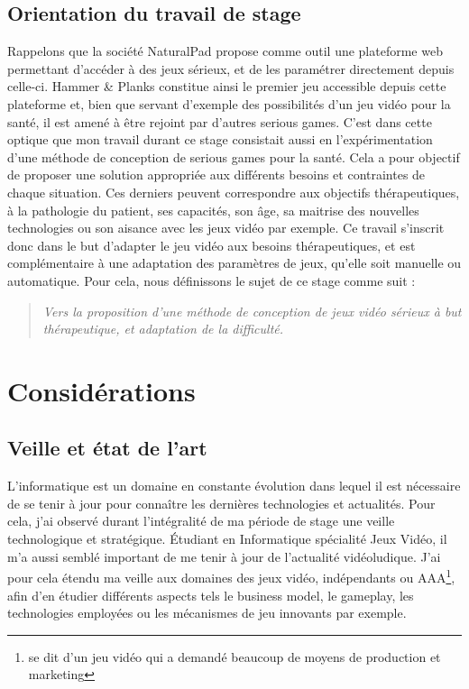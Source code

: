 \documentclass[french, 12pt]{article} %
\begin{document}
	\subsection{Orientation du travail de stage}
Rappelons que la société NaturalPad propose comme outil une plateforme web permettant d'accéder à des jeux sérieux, et de les paramétrer directement depuis celle-ci. Hammer \& Planks constitue ainsi le premier jeu accessible depuis cette plateforme et, bien que servant d'exemple des possibilités d'un jeu vidéo pour la santé, il est amené à être rejoint par d'autres serious games. C'est dans cette optique que mon travail durant ce stage consistait aussi en l'expérimentation d'une méthode de conception de serious games pour la santé. Cela a pour objectif de proposer une solution appropriée aux différents besoins et contraintes de chaque situation. Ces derniers peuvent correspondre aux objectifs thérapeutiques, à la pathologie du patient, ses capacités, son âge, sa maitrise des nouvelles technologies ou son aisance avec les jeux vidéo par exemple. Ce travail s'inscrit donc  dans le but d'adapter le jeu vidéo aux besoins thérapeutiques, et est complémentaire à une adaptation des paramètres de jeux, qu'elle soit manuelle ou automatique. Pour cela, nous définissons le sujet de ce stage comme suit :
\begin{quote}
	\emph{Vers la proposition d'une méthode de conception de jeux vidéo sérieux à but thérapeutique, et adaptation de la difficulté.}
\end{quote}
	

\section{Considérations}
	\subsection{Veille et état de l'art}
L'informatique est un domaine en constante évolution dans lequel il est nécessaire de se tenir à jour pour connaître les dernières technologies et actualités. Pour cela, j'ai observé durant l'intégralité de ma période de stage une veille technologique et stratégique. Étudiant en Informatique spécialité Jeux Vidéo, il m'a aussi semblé important de me tenir à jour  de l'actualité vidéoludique. J'ai pour cela étendu ma veille aux domaines des jeux vidéo, indépendants ou AAA\footnote{se dit d'un jeu vidéo qui a demandé beaucoup de moyens de production et marketing}, afin d'en étudier différents aspects tels le business model, le gameplay, les technologies employées ou les mécanismes de jeu innovants par exemple. 
\end{document}
